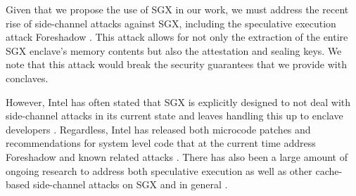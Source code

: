 Given that we propose the use of SGX in our work, we must address the recent rise
 of side-channel attacks against SGX, including
the speculative execution attack Foreshadow \cite{foreshadow,
weisse2018foreshadow}.  This attack allows for not only the extraction of the
entire SGX enclave's memory contents but also the attestation and sealing keys.
We note that this attack would break the security guarantees that we provide
with conclaves.

However, Intel has often stated that SGX is explicitly designed to not deal
with side-channel attacks in its current state and leaves handling this up to
enclave developers \cite{sgx-sidechannel, sgx-developers}.  Regardless, Intel
has released both microcode patches and recommendations for system level code
that at the current time address Foreshadow and known related attacks
\cite{sgx-patch, canella2018systematic, weisse2018foreshadow}.  There has also
been a large amount of ongoing research to address both speculative execution
as well as other cache-based side-channel attacks on SGX and in general
\cite{yan2018invisispec, oleksenko2018varys, canella2018systematic, shih2017t}.


